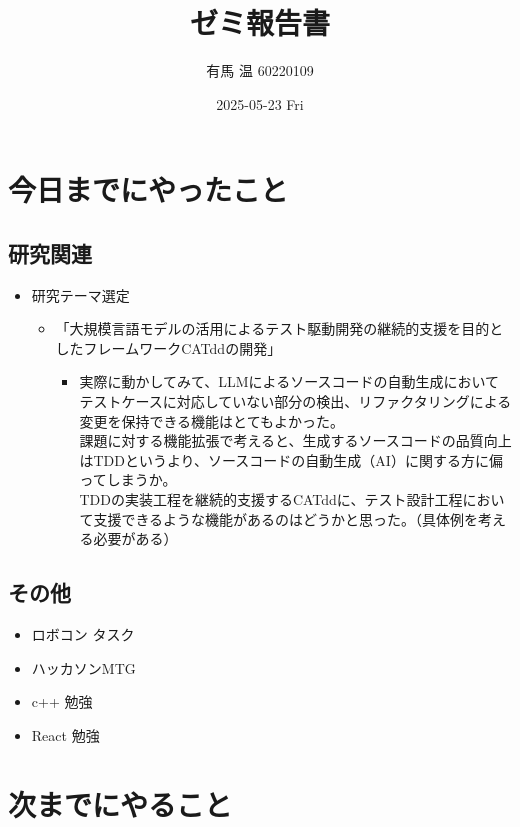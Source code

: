 \documentclass[uplatex, onecolumn, 10pt]{jsarticle}
\begin{document}
\title{\vspace{-40mm}\bf{\LARGE{ゼミ報告書}}}
\author{\vspace{-40mm}有馬 温 60220109}
\date{2025-05-23 Fri}
\maketitle


\section{今日までにやったこと}

\subsection*{研究関連} 
\begin{itemize}
	\item 研究テーマ選定
		\begin{itemize}
			\item 「大規模言語モデルの活用によるテスト駆動開発の継続的支援を目的としたフレームワークCATddの開発」 
			\begin{itemize}
                \item 実際に動かしてみて、LLMによるソースコードの自動生成においてテストケースに対応していない部分の検出、リファクタリングによる変更を保持できる機能はとてもよかった。\\
                課題に対する機能拡張で考えると、生成するソースコードの品質向上はTDDというより、ソースコードの自動生成（AI）に関する方に偏ってしまうか。\\
                TDDの実装工程を継続的支援するCATddに、テスト設計工程において支援できるような機能があるのはどうかと思った。（具体例を考える必要がある）
            \end{itemize}
		\end{itemize}
\end{itemize}

\subsection*{その他}
\begin{itemize}
	\item ロボコン タスク
	\item ハッカソンMTG
	\item c++ 勉強
	\item React 勉強
\end{itemize}


\section{次までにやること}
\end{document}
